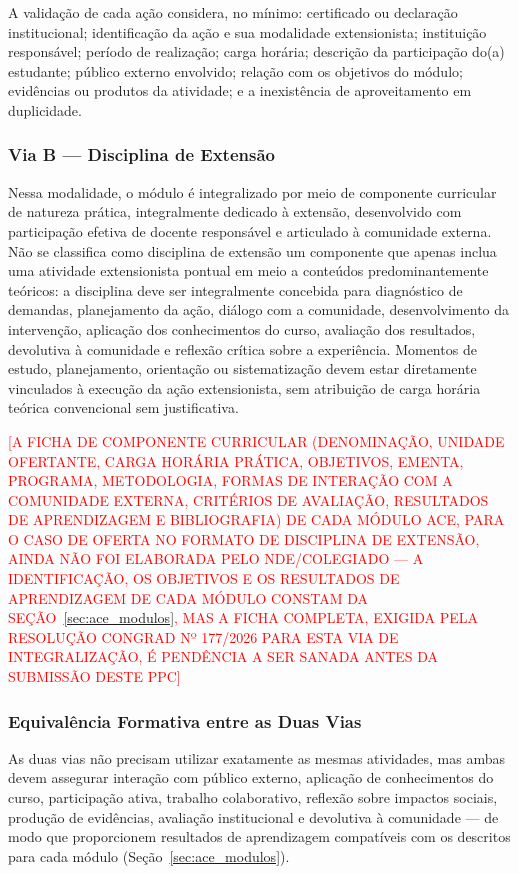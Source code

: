 A validação de cada ação considera, no mínimo: certificado ou declaração institucional; identificação da ação e sua modalidade extensionista; instituição responsável; período de realização; carga horária; descrição da participação do(a) estudante; público externo envolvido; relação com os objetivos do módulo; evidências ou produtos da atividade; e a inexistência de aproveitamento em duplicidade.

\subsubsection{Via B --- Disciplina de Extensão}

Nessa modalidade, o módulo é integralizado por meio de componente curricular de natureza prática, integralmente dedicado à extensão, desenvolvido com participação efetiva de docente responsável e articulado à comunidade externa. Não se classifica como disciplina de extensão um componente que apenas inclua uma atividade extensionista pontual em meio a conteúdos predominantemente teóricos: a disciplina deve ser integralmente concebida para diagnóstico de demandas, planejamento da ação, diálogo com a comunidade, desenvolvimento da intervenção, aplicação dos conhecimentos do curso, avaliação dos resultados, devolutiva à comunidade e reflexão crítica sobre a experiência. Momentos de estudo, planejamento, orientação ou sistematização devem estar diretamente vinculados à execução da ação extensionista, sem atribuição de carga horária teórica convencional sem justificativa.

\textcolor{red}{[A FICHA DE COMPONENTE CURRICULAR (DENOMINAÇÃO, UNIDADE OFERTANTE, CARGA HORÁRIA PRÁTICA, OBJETIVOS, EMENTA, PROGRAMA, METODOLOGIA, FORMAS DE INTERAÇÃO COM A COMUNIDADE EXTERNA, CRITÉRIOS DE AVALIAÇÃO, RESULTADOS DE APRENDIZAGEM E BIBLIOGRAFIA) DE CADA MÓDULO ACE, PARA O CASO DE OFERTA NO FORMATO DE DISCIPLINA DE EXTENSÃO, AINDA NÃO FOI ELABORADA PELO NDE/COLEGIADO — A IDENTIFICAÇÃO, OS OBJETIVOS E OS RESULTADOS DE APRENDIZAGEM DE CADA MÓDULO CONSTAM DA SEÇÃO~\ref{sec:ace_modulos}, MAS A FICHA COMPLETA, EXIGIDA PELA RESOLUÇÃO CONGRAD Nº 177/2026 PARA ESTA VIA DE INTEGRALIZAÇÃO, É PENDÊNCIA A SER SANADA ANTES DA SUBMISSÃO DESTE PPC]}

\subsubsection{Equivalência Formativa entre as Duas Vias}

As duas vias não precisam utilizar exatamente as mesmas atividades, mas ambas devem assegurar interação com público externo, aplicação de conhecimentos do curso, participação ativa, trabalho colaborativo, reflexão sobre impactos sociais, produção de evidências, avaliação institucional e devolutiva à comunidade — de modo que proporcionem resultados de aprendizagem compatíveis com os descritos para cada módulo (Seção~\ref{sec:ace_modulos}\unskip).

